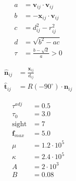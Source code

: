 \begin{align}
a &= \mathbf{v}_{ij} \cdot \mathbf{v}_{ij} \\
b &= -\mathbf{x}_{ij} \cdot \mathbf{v}_{ij} \\
c &= d_{ij}^{2} - r_{ij}^{2} \\
d &= \sqrt{b^{2} - a c} \\
\tau &= \frac{b - \sqrt{d}}{a} > 0
\end{align}

\begin{align}
\hat{\mathbf{n}}_{ij} &= \frac{\mathbf{x}_{ij}}{d_{ij}} \\
\hat{\mathbf{t}}_{ij} &= R(-90^{\circ}) \cdot \mathbf{n}_{ij}
\end{align}


\begin{align}
\tau^{adj} &= 0.5 \\
\tau_{0} &= 3.0 \\
\text{sight} & = 7 \\
\mathbf{f}_{max} &= 5.0 \\
\mu &= 1.2 \cdot 10^{5} \\
\kappa &= 2.4 \cdot 10^{5} \\
A &= 2\cdot 10^{3} \\
B &= 0.08
\end{align}
